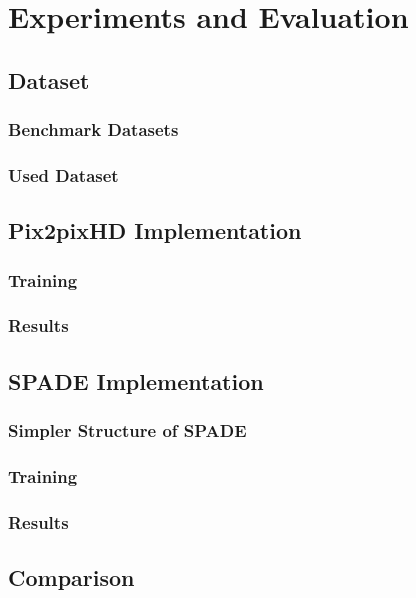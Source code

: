 \chapter{Experiments and Evaluation}
\section{Dataset}
\subsection{Benchmark Datasets}
\subsection{Used Dataset}
\section{Pix2pixHD Implementation}
\subsection{Training}
\subsection{Results}
\section{SPADE Implementation}
\subsection{Simpler Structure of SPADE}
\subsection{Training}
\subsection{Results}
\section{Comparison}
